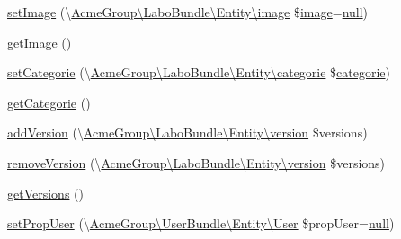 \begin{DoxyCompactItemize}
\item 
\hyperlink{class_acme_group_1_1_labo_bundle_1_1_entity_1_1fiche_creative_a71a55edb60e4a1bb357b32482a5420b2}{set\+Image} (\textbackslash{}\hyperlink{class_acme_group_1_1_labo_bundle_1_1_entity_1_1image}{Acme\+Group\textbackslash{}\+Labo\+Bundle\textbackslash{}\+Entity\textbackslash{}image} \$\hyperlink{class_acme_group_1_1_labo_bundle_1_1_entity_1_1image}{image}=\hyperlink{validate_8js_afb8e110345c45e74478894341ab6b28e}{null})
\item 
\hyperlink{class_acme_group_1_1_labo_bundle_1_1_entity_1_1fiche_creative_ab449366a9fa2e06dcb4a9eb70e58f2a1}{get\+Image} ()
\item 
\hyperlink{class_acme_group_1_1_labo_bundle_1_1_entity_1_1fiche_creative_a9a78160ab65994bd3e5fc7f9681e6665}{set\+Categorie} (\textbackslash{}\hyperlink{class_acme_group_1_1_labo_bundle_1_1_entity_1_1categorie}{Acme\+Group\textbackslash{}\+Labo\+Bundle\textbackslash{}\+Entity\textbackslash{}categorie} \$\hyperlink{class_acme_group_1_1_labo_bundle_1_1_entity_1_1categorie}{categorie})
\item 
\hyperlink{class_acme_group_1_1_labo_bundle_1_1_entity_1_1fiche_creative_a593d536a2ab62ca3d26ff23b9d227690}{get\+Categorie} ()
\item 
\hyperlink{class_acme_group_1_1_labo_bundle_1_1_entity_1_1fiche_creative_aeb4a2240f60637a14dc9961056bb0d97}{add\+Version} (\textbackslash{}\hyperlink{class_acme_group_1_1_labo_bundle_1_1_entity_1_1version}{Acme\+Group\textbackslash{}\+Labo\+Bundle\textbackslash{}\+Entity\textbackslash{}version} \$versions)
\item 
\hyperlink{class_acme_group_1_1_labo_bundle_1_1_entity_1_1fiche_creative_af8884bbe3c2e2ff215fec0845cd4f7dc}{remove\+Version} (\textbackslash{}\hyperlink{class_acme_group_1_1_labo_bundle_1_1_entity_1_1version}{Acme\+Group\textbackslash{}\+Labo\+Bundle\textbackslash{}\+Entity\textbackslash{}version} \$versions)
\item 
\hyperlink{class_acme_group_1_1_labo_bundle_1_1_entity_1_1fiche_creative_aa34a74416604d0f625528739914ebdb0}{get\+Versions} ()
\item 
\hyperlink{class_acme_group_1_1_labo_bundle_1_1_entity_1_1fiche_creative_ac62b9ec6aba9c03b8fd8379208b86a7c}{set\+Prop\+User} (\textbackslash{}\hyperlink{class_acme_group_1_1_user_bundle_1_1_entity_1_1_user}{Acme\+Group\textbackslash{}\+User\+Bundle\textbackslash{}\+Entity\textbackslash{}\+User} \$prop\+User=\hyperlink{validate_8js_afb8e110345c45e74478894341ab6b28e}{null})
\item 

\end{DoxyCompactItemize}
